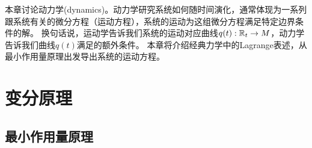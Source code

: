 本章讨论动力学(dynamics)。动力学研究系统如何随时间演化，通常体现为一系列跟系统有关的微分方程（运动方程），系统的运动为这组微分方程满足特定边界条件的解。
换句话说，运动学告诉我们系统的运动对应曲线$q(t):\mathbb R_t\to M$，动力学告诉我们曲线$q(t)$满足的额外条件。
本章将介绍经典力学中的Lagrange表述，从最小作用量原理出发导出系统的运动方程。

\chapter{变分原理}

\section{最小作用量原理}

